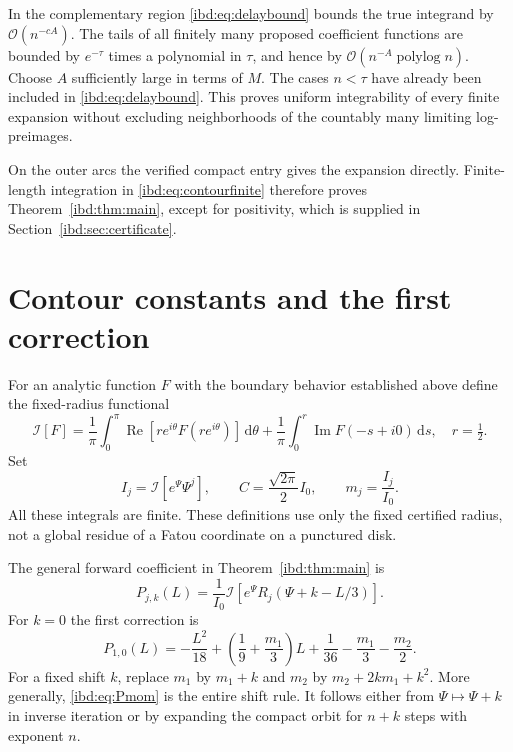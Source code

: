 \documentclass[11pt,letterpaper]{article}
\theoremstyle{remark}\newtheorem{remark}[theorem]{Remark}
\newcommand{\I}{\mathcal I}
\newcommand{\dd}{\,\mathrm d}
\newcommand{\Oh}{\mathcal O}
\DeclareMathOperator{\Rea}{Re}
\DeclareMathOperator{\Ima}{Im}
\begin{document}
In the complementary region \eqref{ibd:eq:delaybound} bounds the true integrand by $\Oh(n^{-cA})$. The tails of all finitely many proposed coefficient functions are bounded by $e^{-\tau}$ times a polynomial in $\tau$, and hence by $\Oh(n^{-A}\operatorname{polylog}n)$. Choose $A$ sufficiently large in terms of $M$. The cases $n<\tau$ have already been included in \eqref{ibd:eq:delaybound}. This proves uniform integrability of every finite expansion without excluding neighborhoods of the countably many limiting log-preimages.

On the outer arcs the verified compact entry gives the expansion directly. Finite-length integration in \eqref{ibd:eq:contourfinite} therefore proves Theorem~\ref{ibd:thm:main}, except for positivity, which is supplied in Section~\ref{ibd:sec:certificate}.

\section{Contour constants and the first correction}\label{ibd:sec:constants}
For an analytic function $F$ with the boundary behavior established above define the fixed-radius functional
\begin{equation}\label{ibd:eq:Ifunc}
 \I[F]=\frac1\pi\int_0^\pi\Rea\!\left[r e^{i\theta}F(r e^{i\theta})\right]\dd\theta
 +\frac1\pi\int_0^r\Ima F(-s+i0)\dd s,\quad r=\tfrac12.
\end{equation}
Set
\[
 I_j=\I[e^{\Psi}\Psi^j],\qquad C=\frac{\sqrt{2\pi}}2 I_0,
 \qquad m_j=\frac{I_j}{I_0}.
\]
All these integrals are finite. These definitions use only the fixed certified radius, not a global residue of a Fatou coordinate on a punctured disk.

The general forward coefficient in Theorem~\ref{ibd:thm:main} is
\begin{equation}\label{ibd:eq:Pmom}
 P_{j,k}(L)=\frac1{I_0}\I\!\left[e^{\Psi}R_j(\Psi+k-L/3)\right].
\end{equation}
For $k=0$ the first correction is
\begin{equation}\label{ibd:eq:first}
 P_{1,0}(L)=-\frac{L^2}{18}+
 \left(\frac19+\frac{m_1}3\right)L+\frac1{36}-\frac{m_1}3-\frac{m_2}2.
\end{equation}
For a fixed shift $k$, replace $m_1$ by $m_1+k$ and $m_2$ by $m_2+2km_1+k^2$. More generally, \eqref{ibd:eq:Pmom} is the entire shift rule. It follows either from $\Psi\mapsto\Psi+k$ in inverse iteration or by expanding the compact orbit for $n+k$ steps with exponent $n$.
\end{document}
